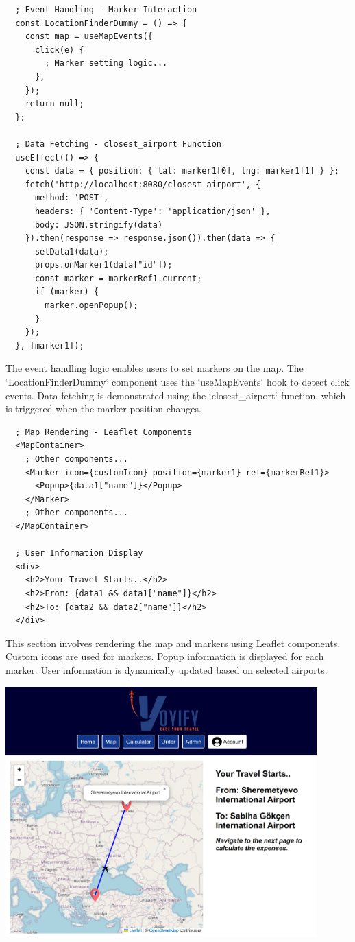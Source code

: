 \documentclass[12pt]{article}
\begin{document}
\begin{verbatim}
  ; Event Handling - Marker Interaction
  const LocationFinderDummy = () => {
    const map = useMapEvents({
      click(e) {
        ; Marker setting logic...
      },
    });
    return null;
  };

  ; Data Fetching - closest_airport Function
  useEffect(() => {
    const data = { position: { lat: marker1[0], lng: marker1[1] } };
    fetch('http://localhost:8080/closest_airport', {
      method: 'POST',
      headers: { 'Content-Type': 'application/json' },
      body: JSON.stringify(data)
    }).then(response => response.json()).then(data => {
      setData1(data);
      props.onMarker1(data["id"]);
      const marker = markerRef1.current;
      if (marker) {
        marker.openPopup();
      }
    });
  }, [marker1]);
\end{verbatim}

The event handling logic enables users to set markers on the map. The `LocationFinderDummy` component uses the `useMapEvents` hook to detect click events. Data fetching is demonstrated using the `closest\_airport` function, which is triggered when the marker position changes.

\begin{verbatim}
  ; Map Rendering - Leaflet Components
  <MapContainer>
    ; Other components...
    <Marker icon={customIcon} position={marker1} ref={markerRef1}>
      <Popup>{data1["name"]}</Popup>
    </Marker>
    ; Other components...
  </MapContainer>

  ; User Information Display
  <div>
    <h2>Your Travel Starts..</h2>
    <h2>From: {data1 && data1["name"]}</h2>
    <h2>To: {data2 && data2["name"]}</h2>
  </div>
\end{verbatim}

This section involves rendering the map and markers using Leaflet components. Custom icons are used for markers. Popup information is displayed for each marker. User information is dynamically updated based on selected airports.
	\begin{center}
\includegraphics[width=0.9\textwidth]{./images/map.png}
\end{center}
\end{document}
